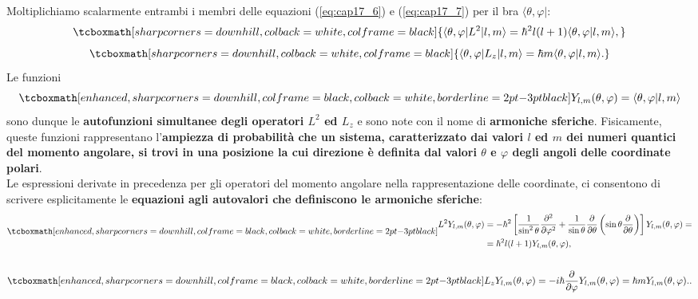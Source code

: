 \documentclass[a4paper,12pt,oneside]{book}
\begin{document}
Moltiplichiamo scalarmente entrambi i membri delle equazioni (\ref{eq:cap17_6}) e (\ref{eq:cap17_7}) per il bra $\langle \theta , \varphi \vert$:
	\begin{equation}
		\tcboxmath[sharp corners=downhill, colback=white, colframe=black]{
			\langle \theta , \varphi \vert L^2 \vert l, m \rangle = \hbar ^2 l(l+1) \langle \theta , \varphi \vert l, m \rangle ,
			}
	\end{equation}
	\begin{equation}
		\tcboxmath[sharp corners=downhill, colback=white, colframe=black]{
			\langle \theta , \varphi \vert L_z \vert l, m \rangle = \hbar m\langle \theta , \varphi \vert l, m \rangle .
			}
	\end{equation}
Le funzioni
	\begin{equation}
		\tcboxmath[enhanced, sharp corners=downhill, colframe=black, colback=white, borderline={2pt}{-3pt}{black}]{
			Y_{l,m} (\theta, \varphi )= \langle \theta , \varphi \vert l, m \rangle 
			}
	\end{equation}
sono dunque le \textbf{autofunzioni simultanee degli operatori $L^2$ ed $L_z$} e sono note con il nome di \textbf{armoniche sferiche}. Fisicamente, queste funzioni rappresentano l'\textbf{ampiezza di probabilità che un sistema, caratterizzato dai valori $l$ ed $m$ dei numeri quantici del momento angolare, si trovi in una posizione la cui direzione è definita dal valori $\theta$ e $\varphi$ degli angoli delle coordinate polari}.\\

Le espressioni derivate in precedenza per gli operatori del momento angolare nella rappresentazione delle coordinate, ci consentono di scrivere esplicitamente le \textbf{equazioni agli autovalori che definiscono le armoniche sferiche}:
	\begin{align}
		\tcboxmath[enhanced, sharp corners=downhill, colframe=black, colback=white, borderline={2pt}{-3pt}{black}]{
		\begin{aligned}
			L^2 Y_{l,m} (\theta, \varphi) &=-\hbar ^2 \left[\frac{1}{\sin ^2 \theta}\frac{\partial ^2}{\partial \varphi ^2}+\frac{1}{\sin \theta}\frac{\partial}{\partial \theta} \left(\sin \theta \frac{\partial}{\partial \theta}\right)\right]Y_{l,m}(\theta, \varphi) =   \\
			&= \hbar ^2 l(l+1)Y_{l,m}(\theta, \varphi) ,
		\end{aligned}
		}\nonumber \\
		\quad
	\label{eq:cap17_8}
	\end{align}
	\begin{equation}
		\tcboxmath[enhanced, sharp corners=downhill, colframe=black, colback=white, borderline={2pt}{-3pt}{black}]{
			L_zY_{l,m}(\theta, \varphi)= -i\hbar \frac{\partial}{\partial \varphi}Y_{l,m}(\theta, \varphi)= \hbar m Y_{l,m}(\theta, \varphi).
			}
	\label{eq:cap17_9}.
	\end{equation}\\
\end{document}
